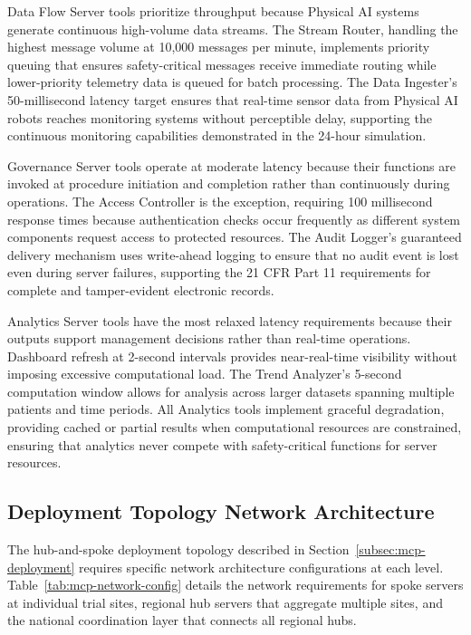 Data Flow Server tools prioritize throughput because Physical AI systems
generate continuous high-volume data streams. The Stream Router, handling the
highest message volume at 10,000 messages per minute, implements priority
queuing that ensures safety-critical messages receive immediate routing while
lower-priority telemetry data is queued for batch processing. The Data
Ingester's 50-millisecond latency target ensures that real-time sensor data
from Physical AI robots reaches monitoring systems without perceptible delay,
supporting the continuous monitoring capabilities demonstrated in the 24-hour
simulation.

Governance Server tools operate at moderate latency because their functions
are invoked at procedure initiation and completion rather than continuously
during operations. The Access Controller is the exception, requiring 100
millisecond response times because authentication checks occur frequently as
different system components request access to protected resources. The Audit
Logger's guaranteed delivery mechanism uses write-ahead logging to ensure that
no audit event is lost even during server failures, supporting the 21 CFR
Part 11 requirements for complete and tamper-evident electronic records.

Analytics Server tools have the most relaxed latency requirements because
their outputs support management decisions rather than real-time operations.
Dashboard refresh at 2-second intervals provides near-real-time visibility
without imposing excessive computational load. The Trend Analyzer's 5-second
computation window allows for analysis across larger datasets spanning
multiple patients and time periods. All Analytics tools implement graceful
degradation, providing cached or partial results when computational resources
are constrained, ensuring that analytics never compete with safety-critical
functions for server resources.

\subsection{Deployment Topology Network Architecture}
\label{subsec:mcp-network-arch}

The hub-and-spoke deployment topology described in
Section~\ref{subsec:mcp-deployment} requires specific network architecture
configurations at each level. Table~\ref{tab:mcp-network-config} details the
network requirements for spoke servers at individual trial sites, regional hub
servers that aggregate multiple sites, and the national coordination layer that
connects all regional hubs.

